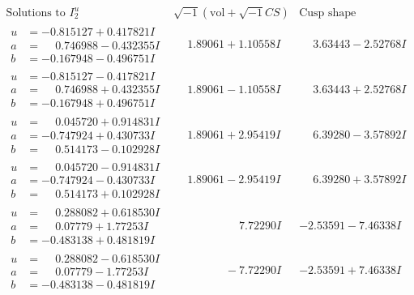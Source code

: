 \documentclass[1p]{elsarticle_modified}
\theoremstyle{definition}
\newcommand{\I}{\sqrt{-1}}
\begin{document}
$$\begin{array}{c|c|c}  
\text{Solutions to }I^u_{2}& \I (\text{vol} + \sqrt{-1}CS) & \text{Cusp shape}\\
 \hline 
\begin{aligned}
u &= -0.815127 + 0.417821 I \\
a &= \phantom{-}0.746988 - 0.432355 I \\
b &= -0.167948 - 0.496751 I\end{aligned}
 & \phantom{-}1.89061 + 1.10558 I & \phantom{-}3.63443 - 2.52768 I \\ \hline\begin{aligned}
u &= -0.815127 - 0.417821 I \\
a &= \phantom{-}0.746988 + 0.432355 I \\
b &= -0.167948 + 0.496751 I\end{aligned}
 & \phantom{-}1.89061 - 1.10558 I & \phantom{-}3.63443 + 2.52768 I \\ \hline\begin{aligned}
u &= \phantom{-}0.045720 + 0.914831 I \\
a &= -0.747924 + 0.430733 I \\
b &= \phantom{-}0.514173 - 0.102928 I\end{aligned}
 & \phantom{-}1.89061 + 2.95419 I & \phantom{-}6.39280 - 3.57892 I \\ \hline\begin{aligned}
u &= \phantom{-}0.045720 - 0.914831 I \\
a &= -0.747924 - 0.430733 I \\
b &= \phantom{-}0.514173 + 0.102928 I\end{aligned}
 & \phantom{-}1.89061 - 2.95419 I & \phantom{-}6.39280 + 3.57892 I \\ \hline\begin{aligned}
u &= \phantom{-}0.288082 + 0.618530 I \\
a &= \phantom{-}0.07779 + 1.77253 I \\
b &= -0.483138 + 0.481819 I\end{aligned}
 & \phantom{-0.000000 -}7.72290 I & -2.53591 - 7.46338 I \\ \hline\begin{aligned}
u &= \phantom{-}0.288082 - 0.618530 I \\
a &= \phantom{-}0.07779 - 1.77253 I \\
b &= -0.483138 - 0.481819 I\end{aligned}
 & \phantom{-0.000000 } -7.72290 I & -2.53591 + 7.46338 I \\ \hline\begin{aligned}

\end{aligned}
\end{array}$$
\end{document}
